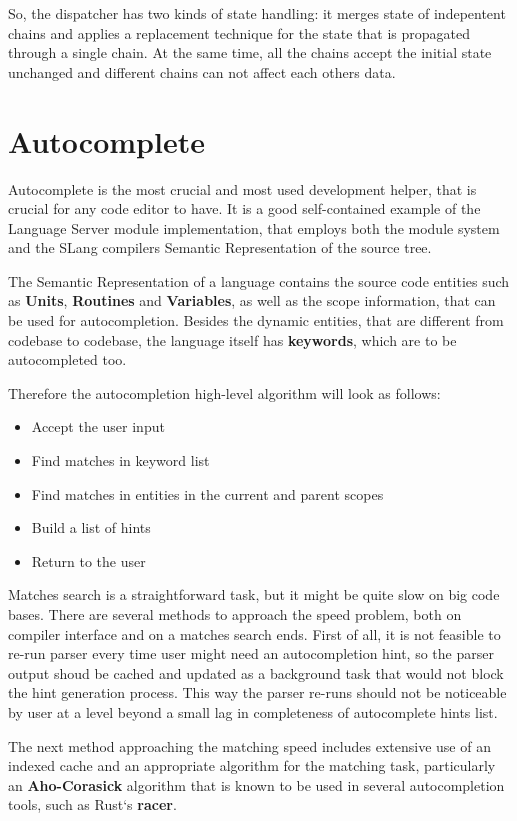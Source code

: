 So, the dispatcher has two kinds of state handling: it merges state of indepentent chains
and applies a replacement technique for the state that is propagated through a single chain.
At the same time, all the chains accept the initial state unchanged and different chains
can not affect each others data.

\section{Autocomplete}
\label{sec:impl:ls_mod:autocomplete}
Autocomplete is the most crucial and most used development helper, that is crucial for any code editor to have.
It is a good self-contained example of the Language Server module implementation, that employs
both the module system and the SLang compilers Semantic Representation of the source tree.

The Semantic Representation of a language contains the source code entities such as \textbf{Units},
\textbf{Routines} and \textbf{Variables}, as well as the scope information, that can be used for autocompletion.
Besides the dynamic entities, that are different from codebase to codebase, the language itself
has \textbf{keywords}, which are to be autocompleted too.

Therefore the autocompletion high-level algorithm will look as follows:
\begin{itemize}
\item Accept the user input
\item Find matches in keyword list
\item Find matches in entities in the current and parent scopes
\item Build a list of hints
\item Return to the user
\end{itemize}

Matches search is a straightforward task, but it might be quite slow on big code bases.
There are several methods to approach the speed problem, both on compiler interface
and on a matches search ends. First of all, it is not feasible to re-run parser every time user
might need an autocompletion hint, so the parser output shoud be cached and updated as a background task
that would not block the hint generation process. This way the parser re-runs should not be noticeable by user
at a level beyond a small lag in completeness of autocomplete hints list.

The next method approaching the matching speed includes extensive use of an indexed cache and
an appropriate algorithm for the matching task, particularly an \textbf{Aho-Corasick} algorithm
that is known to be used in several autocompletion tools, such as Rust`s \textbf{racer}.

